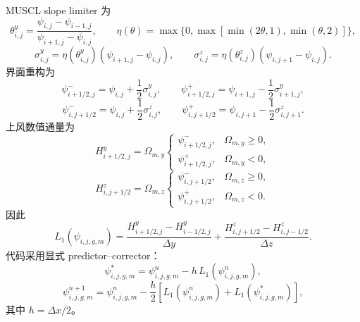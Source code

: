 \documentclass[11pt,a4paper]{ctexart}
\begin{document}
MUSCL slope limiter 为
\begin{equation}
  \theta^y_{i,j}
  =
  \frac{\psi_{i,j}-\psi_{i-1,j}}
       {\psi_{i+1,j}-\psi_{i,j}},
  \qquad
  \eta(\theta)
  =
  \max\{0,\max[\min(2\theta,1),\min(\theta,2)]\},
\end{equation}
\begin{equation}
  \sigma^y_{i,j}
  =
  \eta(\theta^y_{i,j})(\psi_{i+1,j}-\psi_{i,j}),
  \qquad
  \sigma^z_{i,j}
  =
  \eta(\theta^z_{i,j})(\psi_{i,j+1}-\psi_{i,j}).
\end{equation}
界面重构为
\begin{equation}
  \psi^-_{i+1/2,j}=\psi_{i,j}+\frac12\sigma^y_{i,j},
  \qquad
  \psi^+_{i+1/2,j}=\psi_{i+1,j}-\frac12\sigma^y_{i+1,j},
\end{equation}
\begin{equation}
  \psi^-_{i,j+1/2}=\psi_{i,j}+\frac12\sigma^z_{i,j},
  \qquad
  \psi^+_{i,j+1/2}=\psi_{i,j+1}-\frac12\sigma^z_{i,j+1}.
\end{equation}
上风数值通量为
\begin{equation}
  H^y_{i+1/2,j}
  =
  \Omega_{m,y}
  \begin{cases}
    \psi^-_{i+1/2,j}, & \Omega_{m,y}\ge0,\\
    \psi^+_{i+1/2,j}, & \Omega_{m,y}<0,
  \end{cases}
\end{equation}
\begin{equation}
  H^z_{i,j+1/2}
  =
  \Omega_{m,z}
  \begin{cases}
    \psi^-_{i,j+1/2}, & \Omega_{m,z}\ge0,\\
    \psi^+_{i,j+1/2}, & \Omega_{m,z}<0.
  \end{cases}
\end{equation}
因此
\begin{equation}
  L_1(\psi_{i,j,g,m})
  =
  \frac{H^y_{i+1/2,j}-H^y_{i-1/2,j}}{\Delta y}
  +
  \frac{H^z_{i,j+1/2}-H^z_{i,j-1/2}}{\Delta z}.
\end{equation}
代码采用显式 predictor--corrector：
\begin{equation}
  \psi^\ast_{i,j,g,m}
  =
  \psi^n_{i,j,g,m}
  -
  h\,L_1(\psi^n_{i,j,g,m}),
\end{equation}
\begin{equation}
  \psi^{n+1}_{i,j,g,m}
  =
  \psi^n_{i,j,g,m}
  -
  \frac{h}{2}
  \left[
    L_1(\psi^n_{i,j,g,m})
    +
    L_1(\psi^\ast_{i,j,g,m})
  \right],
\end{equation}
其中 \(h=\Delta x/2\)。
\end{document}
